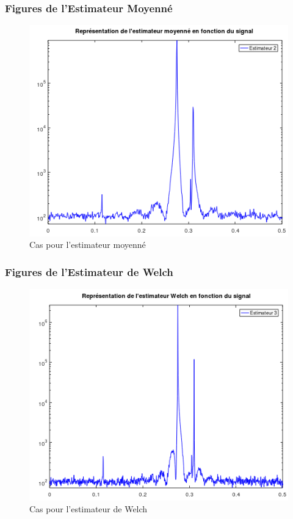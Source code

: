\documentclass{article}
\begin{document}
\subsubsection{Figures de l'Estimateur Moyenné}
\begin{figure}[h]
\centerline{\includegraphics[width=1\textwidth]{images/casESMSignalInconnue.png}}
\caption{Cas pour l'estimateur moyenné}
\end{figure}
\newpage
\subsubsection{Figures de l'Estimateur de Welch}
\begin{figure}[h]
\centerline{\includegraphics[width=1\textwidth]{images/casESWSignalInconnue.png}}
\caption{Cas pour l'estimateur de Welch}
\end{figure}
\end{document}
